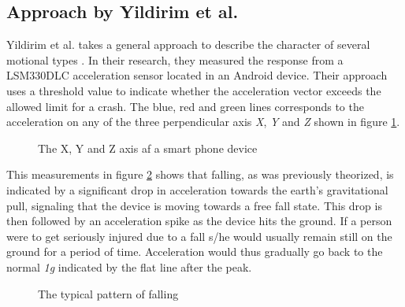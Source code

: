 \documentclass[12pt, a4paper, onecolumn]{article}
\begin{document}
	\subsection{Approach by Yildirim et al.}
	
	Yildirim et al. takes a general approach to describe the character of several motional types \cite{int_journ}. In their research, they measured the response from a LSM330DLC acceleration sensor located in an Android device. Their approach uses a threshold value to indicate whether the acceleration vector exceeds the allowed limit for a crash. The blue, red and green lines corresponds to the acceleration on any of the three perpendicular axis \textit{X}, \textit{Y} and \textit{Z} shown in figure \ref{fig:XYZ-Axis}.
	
	\begin{figure}[H]
		\centering
		\caption{The X, Y and Z axis af a smart phone device}%
		\label{fig:XYZ-Axis}%
	\end{figure}
	
	\noindent This measurements in figure \ref{fig:Pattern-Falling} shows that falling, as was previously theorized, is indicated by a significant drop in acceleration towards the earth's gravitational pull, signaling that the device is moving towards a free fall state. This drop is then followed by an acceleration spike as the device hits the ground. If a person were to get seriously injured due to a fall s/he would usually remain still on the ground for a period of time. Acceleration would thus gradually go back to the normal \textit{1g} indicated by the flat line after the peak. 
	
	\begin{figure}[H]
		\centering
		\caption{The typical pattern of falling}%
		\label{fig:Pattern-Falling}%
	\end{figure}
\end{document}
